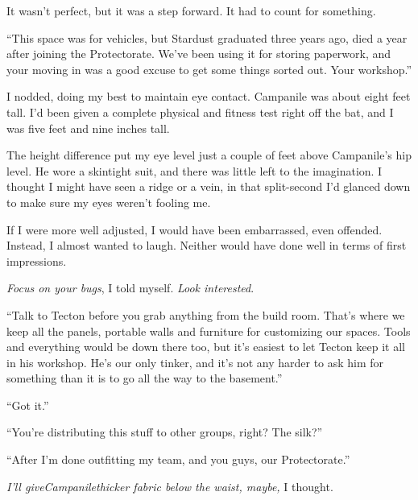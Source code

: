 It wasn't perfect, but it was a step forward.  It had to count for something.



\sectionbreak



``This space was for vehicles, but Stardust graduated three years ago, died a year after joining the Protectorate.  We've been using it for storing paperwork, and your moving in was a good excuse to get some things sorted out.  Your workshop.''



I nodded, doing my best to maintain eye contact.  Campanile was about eight feet tall.  I'd been given a complete physical and fitness test right off the bat, and I was five feet and nine inches tall.



The height difference put my eye level just a couple of feet above Campanile's hip level.  He wore a skintight suit, and there was little left to the imagination.  I thought I might have seen a ridge or a vein, in that split-second I'd glanced down to make sure my eyes weren't fooling me.



If I were more well adjusted, I would have been embarrassed, even offended.  Instead, I almost wanted to laugh.  Neither would have done well in terms of first impressions.



\emph{Focus on your bugs}, I told myself.  \emph{Look interested}.



``Talk to Tecton before you grab anything from the build room.  That's where we keep all the panels, portable walls and furniture for customizing our spaces.  Tools and everything would be down there too, but it's easiest to let Tecton keep it all in his workshop.  He's our only tinker, and it's not any harder to ask him for something than it is to go all the way to the basement.''



``Got it.''



``You're distributing this stuff to other groups, right?  The silk?''



``After I'm done outfitting my team, and you guys, our Protectorate.''



\emph{I'll give}\emph{Campanile}\emph{thicker fabric below the waist, maybe, }I thought.



